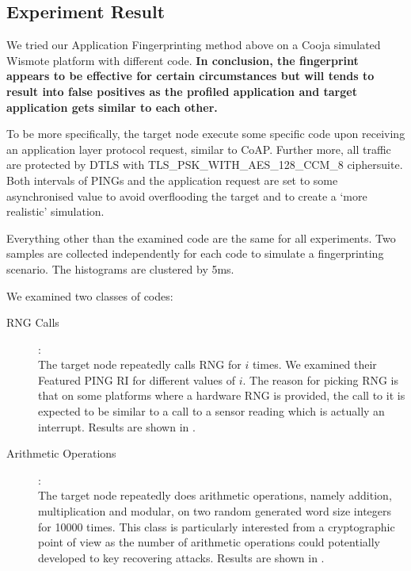 \subsection{Experiment Result}
We tried our Application Fingerprinting method above on a Cooja simulated Wismote platform with different code. \textbf{In conclusion, the fingerprint appears to be effective for certain circumstances but will tends to result into false positives as the profiled application and target application gets similar to each other.}

To be more specifically, the target node execute some specific code upon receiving an application layer protocol request, similar to CoAP. Further more, all traffic are protected by DTLS with TLS\_PSK\_WITH\_AES\_128\_CCM\_8 ciphersuite. Both intervals of PINGs and the application request are set to some asynchronised value to avoid overflooding the target and to create a ‘more realistic’ simulation.

Everything other than the examined code are the same for all experiments. Two samples are collected independently for each code to simulate a fingerprinting scenario. The histograms are clustered by 5ms.

We examined two classes of codes:
\begin{description}
\item[RNG Calls]: \hfill\\
The target node repeatedly calls RNG for $i$ times. We examined their Featured PING RI for different values of $i$. The reason for picking RNG is that on some platforms where a hardware RNG is provided, the call to it is expected to be similar to a call to a sensor reading which is actually an interrupt. Results are shown in .

\item[Arithmetic Operations]: \hfill\\
The target node repeatedly does arithmetic operations, namely addition, multiplication and modular, on two random generated word size integers for 10000 times. This class is particularly interested from a cryptographic point of view as the number of arithmetic operations could potentially developed to key recovering attacks. Results are shown in .
\end{description}



